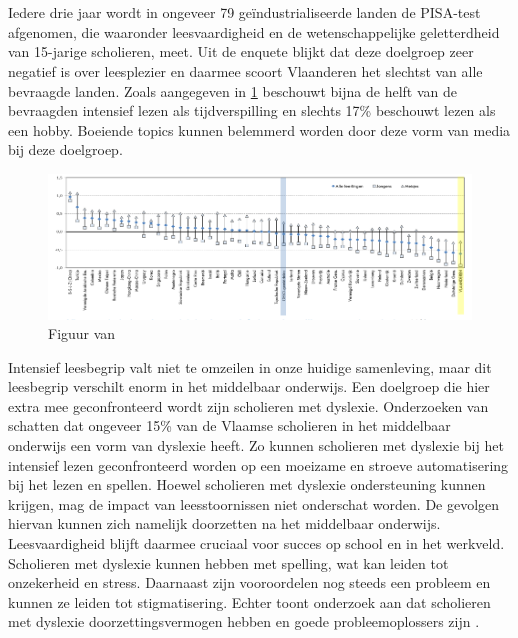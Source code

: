 \section{}%
\label{sec:probleemstelling}

Iedere drie jaar wordt in ongeveer 79 geïndustrialiseerde landen de PISA-test afgenomen, die waaronder leesvaardigheid en de wetenschappelijke geletterdheid van 15-jarige scholieren, meet. Uit de enquete blijkt dat deze doelgroep zeer negatief is over leesplezier en daarmee scoort Vlaanderen het slechtst van alle bevraagde landen. Zoals aangegeven in \ref*{img:oeso-leesplezier} beschouwt bijna de helft van de bevraagden intensief lezen als tijdverspilling en slechts 17\% beschouwt lezen als een hobby. Boeiende topics kunnen belemmerd worden door deze vorm van media bij deze doelgroep.

\begin{figure}[H]
	\begin{center}
		\includegraphics[width=\linewidth]{img/oeso-graphic-leesplezier.png}
	\end{center}
	\caption{Figuur van \textcite{DeMeyer2019}}
	\label{img:oeso-leesplezier}
\end{figure}

\medspace

Intensief leesbegrip valt niet te omzeilen in onze huidige samenleving, maar dit leesbegrip verschilt enorm in het middelbaar onderwijs. Een doelgroep die hier extra mee geconfronteerd wordt zijn scholieren met dyslexie. Onderzoeken van \textcite{Bonte2020, VanDerMeer2022} schatten dat ongeveer 15\% van de Vlaamse scholieren in het middelbaar onderwijs een vorm van dyslexie heeft. Zo kunnen scholieren met dyslexie bij het intensief lezen geconfronteerd worden op een moeizame en stroeve automatisering bij het lezen en spellen. Hoewel scholieren met dyslexie ondersteuning kunnen krijgen, mag de impact van leesstoornissen niet onderschat worden. De gevolgen hiervan kunnen zich namelijk doorzetten na het middelbaar onderwijs. Leesvaardigheid blijft daarmee cruciaal voor succes op school en in het werkveld. Scholieren met dyslexie kunnen hebben met spelling, wat kan leiden tot onzekerheid en stress. Daarnaast zijn vooroordelen nog steeds een probleem en kunnen ze leiden tot stigmatisering. Echter toont onderzoek aan dat scholieren met dyslexie doorzettingsvermogen hebben en goede probleemoplossers zijn \autocite{Ghesquiere2018, Lissens2020, Bonte2020}. 

